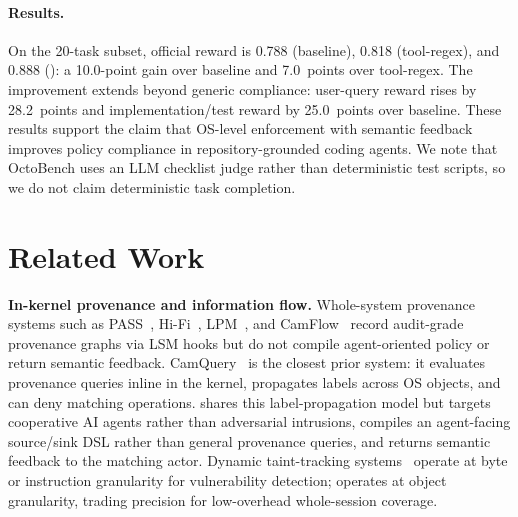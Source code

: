 \paragraph{Results.}
On the 20-task subset, official reward is 0.788 (baseline), 0.818
(tool-regex), and 0.888 (\sys{}): a 10.0-point gain over baseline and
7.0~points over tool-regex. The improvement extends beyond generic
compliance: user-query reward rises by 28.2~points and
implementation/test reward by 25.0~points over baseline. These results
support the claim that OS-level enforcement with semantic feedback
improves policy compliance in repository-grounded coding agents. We note
that OctoBench uses an LLM checklist judge rather than deterministic test
scripts, so we do not claim deterministic task completion.

\section{Related Work}
\label{sec:related}

\textbf{In-kernel provenance and information flow.}
Whole-system provenance systems such as PASS~\cite{muniswamy2006pass},
Hi-Fi~\cite{pohly2012hifi}, LPM~\cite{bates2015lpm}, and
CamFlow~\cite{pasquier2017camflow} record audit-grade provenance
graphs via LSM hooks but do not compile agent-oriented policy or return
semantic feedback. CamQuery~\cite{pasquier2018camquery} is the closest
prior system: it evaluates provenance queries inline in the kernel,
propagates labels across OS objects, and can deny matching operations.
\sys{} shares this label-propagation model but targets cooperative AI
agents rather than adversarial intrusions, compiles an agent-facing
source/sink DSL rather than general provenance queries, and returns
semantic feedback to the matching actor. Dynamic taint-tracking
systems~\cite{enck2010taintdroid,clause2007dytan,kemerlis2012libdft,yin2007panorama}
operate at byte or instruction granularity for vulnerability detection;
\sys{} operates at object granularity, trading precision for low-overhead
whole-session coverage.

